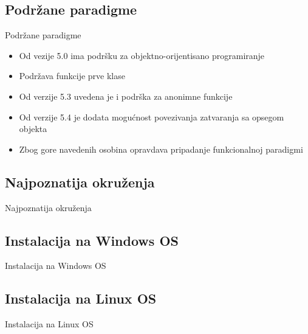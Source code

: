\documentclass{beamer}
\begin{document}
\subsection{Podržane paradigme}
\begin{frame}{Podržane paradigme}
     	\begin{itemize}
		\item Od vezije 5.0 ima podršku za objektno-orijentisano programiranje  
		\item Podržava funkcije prve klase
		\item Od verzije 5.3 uvedena je i podrška za anonimne funkcije	
		\item Od verzije 5.4 je dodata mogućnost povezivanja zatvaranja sa opsegom objekta
		\item Zbog gore navedenih osobina opravdava pripadanje funkcionalnoj paradigmi
	\end{itemize}
\end{frame}


\subsection{Najpoznatija okruženja}
\begin{frame}{Najpoznatija okruženja}
    
\end{frame}

\subsection{Instalacija na Windows OS}

\begin{frame}{Instalacija na Windows OS}



\end{frame}

\subsection{Instalacija na Linux OS}

\begin{frame}{Instalacija na Linux OS}

\end{frame}
\end{document}
